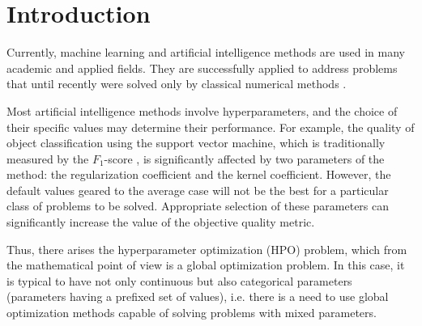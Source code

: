 \documentclass[runningheads]{llncs}
\begin{document}
\section{Introduction}

Currently, machine learning and artificial intelligence methods are used in many academic and applied fields. They are successfully applied to address problems that until recently were solved only by classical numerical methods \cite{Blechschmidt2021,Seleznev2019,Xu2020}. 

Most artificial intelligence methods involve hyperparameters, and the choice of their specific values may determine their performance. For example, the quality of object classification using the support vector machine, which is traditionally measured by the $F_1$-score \cite{NIPS2015}, is significantly affected by two parameters of the method: the regularization coefficient and the kernel coefficient. However, the default values geared to the average case will not be the best for a particular class of problems to be solved. Appropriate selection of these parameters can significantly increase the value of the objective quality metric.

Thus, there arises the hyperparameter optimization (HPO) problem, which from the mathematical point of view is a global optimization problem. In this case, it is typical to have not only continuous but also categorical parameters (parameters having a prefixed set of values), i.e. there is a need to use global optimization methods capable of solving problems with mixed parameters.
\end{document}
